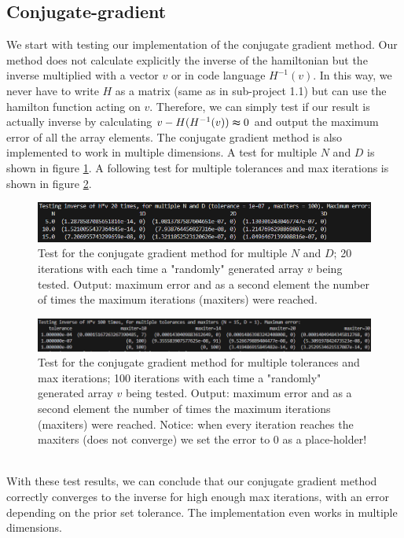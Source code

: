 \documentclass[11pt, letterpaper, onecolumn]{article}
\begin{document}
	\subsection{Conjugate-gradient}
	We start with testing our implementation of the conjugate gradient method. Our method does not calculate explicitly the inverse of the hamiltonian but the inverse multiplied with a vector $v$ or in code language $H^{-1}(v)$. In this way, we never have to write $H$ as a matrix (same as in sub-project 1.1) but can use the hamilton function acting on $v$. Therefore, we can simply test if our result is actually inverse by calculating $v-H(H^{-1}(v))\thickapprox 0$ and output the maximum error of all the array elements. The conjugate gradient method is also implemented to work in multiple dimensions. A test for multiple $N$ and $D$ is shown in figure \ref{fig:test_inverse-ND}. A following test for multiple tolerances and max iterations is shown in figure \ref{fig:test_inverse-tol}.
	\begin{figure} [h] 
	\begin{center}	
	\includegraphics[width=17cm]{"test_inverse_ND2 better.png"}
	\caption{Test for the conjugate gradient method for multiple $N$ and $D$; 20 iterations with each time a "randomly" generated array $v$ being tested. Output: maximum error and as a second element the number of times the maximum iterations (maxiters) were reached.} \label{fig:test_inverse-ND}
	\end{center}
	\end{figure}
	\begin{figure} [h] 
	\begin{center}	
	\includegraphics[width=19cm]{"test_inverse_tolMax.png"}
	\caption{Test for the conjugate gradient method for multiple tolerances and max iterations; 100 iterations with each time a "randomly" generated array $v$ being tested. Output: maximum error and as a second element the number of times the maximum iterations (maxiters) were reached. Notice: when every iteration reaches the maxiters (does not converge) we set the error to 0 as a place-holder!} \label{fig:test_inverse-tol}
	\end{center}
	\end{figure}
	\\
	With these test results, we can conclude that our conjugate gradient method correctly converges to the inverse for high enough max iterations, with an error depending on the prior set tolerance. The implementation even works in multiple dimensions.
	
\end{document}
